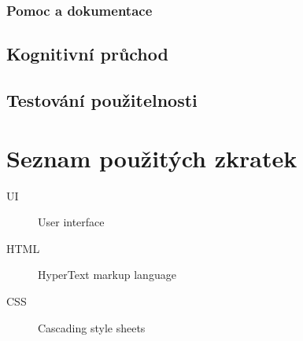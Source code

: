 \documentclass[thesis=B,czech]{FITthesis}[2012/06/26]
\begin{document}
		\subsection{Pomoc a dokumentace}

	\section{Kognitivní průchod}

	\section{Testování použitelnosti}

\begin{conclusion}
\end{conclusion}




\appendix

\chapter{Seznam použitých zkratek}
\begin{description}
	\item[UI] User interface
	\item[HTML] HyperText markup language
	\item[CSS] Cascading style sheets
\end{description}
\end{document}
